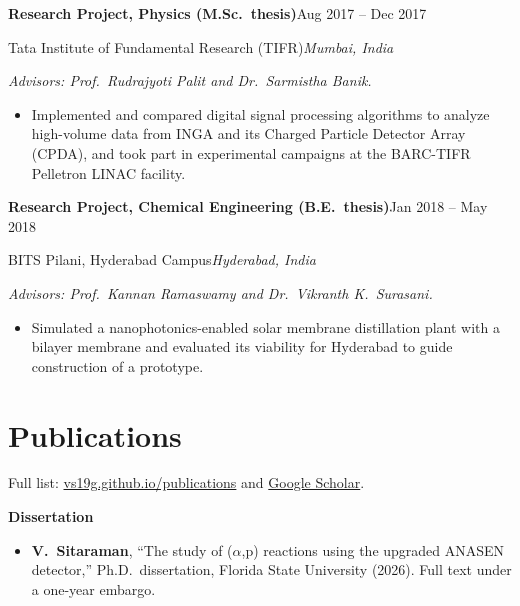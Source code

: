 \documentclass[10pt,letterpaper]{article}
\newcommand{\entry}[4]{%
  \par\addvspace{4pt}\noindent\textbf{#1}\hfill #2\par\nopagebreak
  \noindent #3\hfill\textit{#4}\par\nopagebreak}
\newcommand{\entrynote}[1]{\noindent\textit{#1}\par\nopagebreak}
\newcommand{\subhead}[1]{\par\addvspace{3pt}\noindent\textbf{#1}\par\nopagebreak}
\newcommand{\ap}{(\ensuremath{\alpha},p)}
\newcommand{\me}{\textbf{V.~Sitaraman}}
\begin{document}
\entry{Research Project, Physics (M.Sc.\ thesis)}{Aug 2017 -- Dec 2017}{Tata Institute of Fundamental Research (TIFR)}{Mumbai, India}
\entrynote{Advisors: Prof.\ Rudrajyoti Palit and Dr.\ Sarmistha Banik.}
\begin{itemize}
  \item Implemented and compared digital signal processing algorithms to analyze high-volume data from INGA and its Charged Particle Detector Array (CPDA), and took part in experimental campaigns at the BARC-TIFR Pelletron LINAC facility.
\end{itemize}

\entry{Research Project, Chemical Engineering (B.E.\ thesis)}{Jan 2018 -- May 2018}{BITS Pilani, Hyderabad Campus}{Hyderabad, India}
\entrynote{Advisors: Prof.\ Kannan Ramaswamy and Dr.\ Vikranth K.\ Surasani.}
\begin{itemize}
  \item Simulated a nanophotonics-enabled solar membrane distillation plant with a bilayer membrane and evaluated its viability for Hyderabad to guide construction of a prototype.
\end{itemize}

\section{Publications}
Full list: \href{https://vs19g.github.io/publications/}{vs19g.github.io/publications} and \href{https://scholar.google.com/citations?user=BjY0FunPZVgC}{Google Scholar}.

\subhead{Dissertation}
\begin{itemize}
  \item \me, ``The study of \ap{} reactions using the upgraded ANASEN detector,'' Ph.D.\ dissertation, Florida State University (2026). Full text under a one-year embargo.
\end{itemize}
\end{document}
